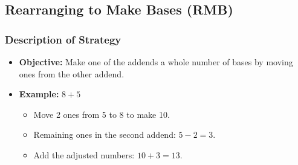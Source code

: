 \documentclass[11pt]{article}
\begin{document}
\subsection*{Rearranging to Make Bases (RMB)}

\subsubsection*{Description of Strategy}
\begin{itemize}
    \item \textbf{Objective:} Make one of the addends a whole number of bases by moving ones from the other addend.
    \item \textbf{Example:} \(8 + 5\)
    \begin{itemize}
        \item Move 2 ones from 5 to 8 to make 10.
        \item Remaining ones in the second addend: \(5 - 2 = 3\).
        \item Add the adjusted numbers: \(10 + 3 = 13\).
    \end{itemize}
\end{itemize}





\end{document}
